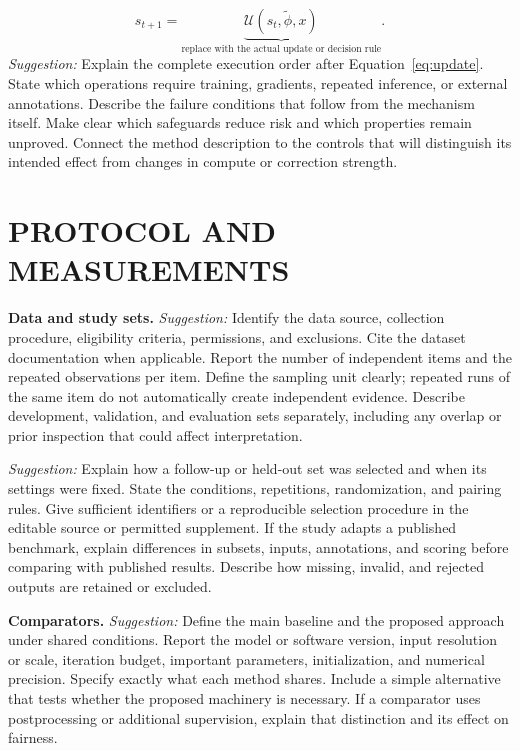 \documentclass[]{spie}
\newcommand{\suggest}{\textit{Suggestion:} }
\begin{document}
\begin{equation}
s_{t+1}=\underbrace{\mathcal U(s_t,\widetilde\phi,x)}_{\text{replace with the actual update or decision rule}}.
\label{eq:update}
\end{equation}
\newpage
\suggest Explain the complete execution order after Equation~\ref{eq:update}. State which operations require training, gradients, repeated inference, or external annotations. Describe the failure conditions that follow from the mechanism itself. Make clear which safeguards reduce risk and which properties remain unproved. Connect the method description to the controls that will distinguish its intended effect from changes in compute or correction strength.

\section{PROTOCOL AND MEASUREMENTS}
\textbf{Data and study sets.} \suggest Identify the data source, collection procedure, eligibility criteria, permissions, and exclusions. Cite the dataset documentation when applicable.\cite{slot30} Report the number of independent items and the repeated observations per item. Define the sampling unit clearly; repeated runs of the same item do not automatically create independent evidence. Describe development, validation, and evaluation sets separately, including any overlap or prior inspection that could affect interpretation.

\suggest Explain how a follow-up or held-out set was selected and when its settings were fixed. State the conditions, repetitions, randomization, and pairing rules. Give sufficient identifiers or a reproducible selection procedure in the editable source or permitted supplement. If the study adapts a published benchmark, explain differences in subsets, inputs, annotations, and scoring before comparing with published results. Describe how missing, invalid, and rejected outputs are retained or excluded.

\textbf{Comparators.} \suggest Define the main baseline and the proposed approach under shared conditions. Report the model or software version, input resolution or scale, iteration budget, important parameters, initialization, and numerical precision. Specify exactly what each method shares. Include a simple alternative that tests whether the proposed machinery is necessary. If a comparator uses postprocessing or additional supervision, explain that distinction and its effect on fairness.
\end{document}
